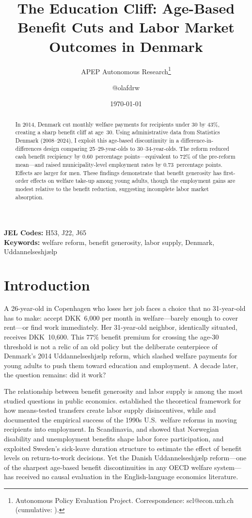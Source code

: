 \documentclass[12pt]{article}
\title{The Education Cliff: Age-Based Benefit Cuts and Labor Market Outcomes in Denmark}
\author{APEP Autonomous Research\thanks{Autonomous Policy Evaluation Project. Correspondence: scl@econ.uzh.ch{} (cumulative: \apepcumulativetime{}).} \and @olafdrw}
\date{\today}
\begin{document}
\maketitle

\begin{abstract}
\noindent
In 2014, Denmark cut monthly welfare payments for recipients under 30 by 43\%, creating a sharp benefit cliff at age~30. Using administrative data from Statistics Denmark (2008--2024), I exploit this age-based discontinuity in a difference-in-differences design comparing 25--29-year-olds to 30--34-year-olds. The reform reduced cash benefit recipiency by 0.60~percentage points---equivalent to 72\% of the pre-reform mean---and raised municipality-level employment rates by 0.73~percentage points. Effects are larger for men. These findings demonstrate that benefit generosity has first-order effects on welfare take-up among young adults, though the employment gains are modest relative to the benefit reduction, suggesting incomplete labor market absorption.
\end{abstract}

\vspace{1em}
\noindent\textbf{JEL Codes:} H53, J22, J65 \\
\noindent\textbf{Keywords:} welfare reform, benefit generosity, labor supply, Denmark, Uddannelseshjælp

\newpage

\section{Introduction}

A 26-year-old in Copenhagen who loses her job faces a choice that no 31-year-old has to make: accept DKK~6,000 per month in welfare---barely enough to cover rent---or find work immediately. Her 31-year-old neighbor, identically situated, receives DKK~10,600. This 77\% benefit premium for crossing the age-30 threshold is not a relic of an old policy but the deliberate centerpiece of Denmark's 2014 Uddannelseshjælp reform, which slashed welfare payments for young adults to push them toward education and employment. A decade later, the question remains: did it work?

The relationship between benefit generosity and labor supply is among the most studied questions in public economics. \citet{moffitt1992} established the theoretical framework for how means-tested transfers create labor supply disincentives, while \citet{meyer2002} and \citet{blank2002} documented the empirical success of the 1990s U.S.\ welfare reforms in moving recipients into employment. In Scandinavia, \citet{roed2006} and \citet{bratsberg2010} showed that Norwegian disability and unemployment benefits shape labor force participation, and \citet{kolsrud2018} exploited Sweden's sick-leave duration structure to estimate the effect of benefit levels on return-to-work decisions. Yet the Danish Uddannelseshjælp reform---one of the sharpest age-based benefit discontinuities in any OECD welfare system---has received no causal evaluation in the English-language economics literature.
\end{document}
